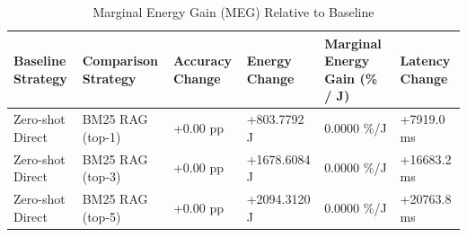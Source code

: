 \begin{table}
\caption{Marginal Energy Gain (MEG) Relative to Baseline}
\label{tab:marginal_energy_gain}
\begin{tabular}{llllll}
\toprule
Baseline Strategy & Comparison Strategy & Accuracy Change & Energy Change & Marginal Energy Gain (\% / J) & Latency Change \\
\midrule
Zero-shot Direct & BM25 RAG (top-1) & +0.00 pp & +803.7792 J & 0.0000 \%/J & +7919.0 ms \\
Zero-shot Direct & BM25 RAG (top-3) & +0.00 pp & +1678.6084 J & 0.0000 \%/J & +16683.2 ms \\
Zero-shot Direct & BM25 RAG (top-5) & +0.00 pp & +2094.3120 J & 0.0000 \%/J & +20763.8 ms \\
\bottomrule
\end{tabular}
\end{table}
